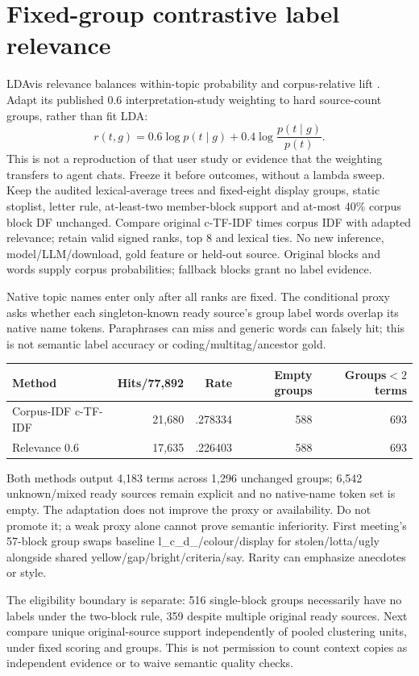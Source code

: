 \documentclass[11pt]{article}
\begin{document}
\section{Fixed-group contrastive label relevance}
LDAvis relevance balances within-topic probability and corpus-relative lift
\cite{ldavisrelevance}. Adapt its published 0.6 interpretation-study weighting
to hard source-count groups, rather than fit LDA:
\[
r(t,g)=0.6\log p(t\mid g)+0.4\log\frac{p(t\mid g)}{p(t)}.
\]
This is not a reproduction of that user study or evidence that the weighting
transfers to agent chats. Freeze it before outcomes, without a lambda sweep.
Keep the audited lexical-average trees and fixed-eight display groups,
static stoplist, letter rule, at-least-two member-block support and at-most 40\%
corpus block DF unchanged. Compare original c-TF-IDF times corpus IDF with
adapted relevance; retain valid signed ranks, top 8 and lexical ties. No new
inference, model/LLM/download, gold feature or held-out source. Original blocks
and words supply corpus probabilities; fallback blocks grant no label evidence.

Native topic names enter only after all ranks are fixed. The conditional proxy
asks whether each singleton-known ready source's group label words overlap
its native name tokens. Paraphrases can miss and generic words can falsely hit;
this is not semantic label accuracy or coding/multitag/ancestor gold.
\begin{center}
\begin{tabular}{lrrrr}
Method & Hits/77,892 & Rate & Empty groups & Groups$<2$ terms\\
\hline
Corpus-IDF c-TF-IDF & 21,680 & .278334 & 588 & 693\\
Relevance 0.6 & 17,635 & .226403 & 588 & 693\\
\end{tabular}
\end{center}
Both methods output 4,183 terms across 1,296 unchanged groups; 6,542 unknown/mixed
ready sources remain explicit and no native-name token set is empty. The
adaptation does not improve the proxy or availability. Do not promote it; a
weak proxy alone cannot prove semantic inferiority. First meeting's 57-block
group swaps baseline l\_c\_d\_/colour/display for stolen/lotta/ugly alongside
shared yellow/gap/bright/criteria/say. Rarity can emphasize anecdotes or style.

The eligibility boundary is separate: 516 single-block groups necessarily have
no labels under the two-block rule, 359 despite multiple original ready sources.
Next compare unique original-source support independently of pooled clustering
units, under fixed scoring and groups. This is not permission to count context
copies as independent evidence or to waive semantic quality checks.
\end{document}
